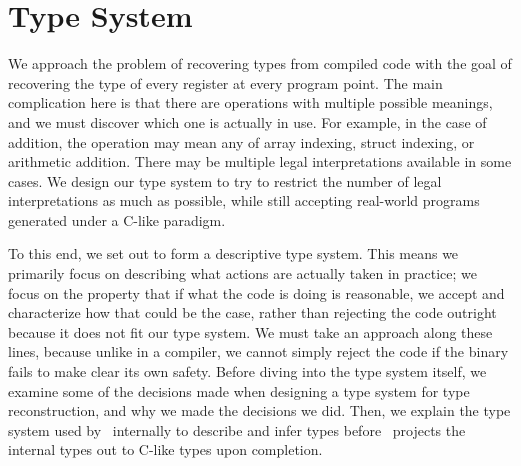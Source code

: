 \section{Type System}
\label{sec:typesys}
We approach the problem of recovering types from compiled code with the goal of recovering the type of every register at every program point. The main complication here is that there are operations with multiple possible meanings, and we must discover which one is actually in use. For example, in the case of addition, the operation may mean any of array indexing, struct indexing, or arithmetic addition.
There may be multiple legal interpretations available in some cases.
We design our type system to try to restrict the number of legal interpretations as much as possible, while still accepting real-world programs generated under a C-like paradigm.

To this end, we set out to form a descriptive type system. This means we primarily focus on describing what actions are actually taken in practice; we focus on the property that if what the code is doing is reasonable, we accept and characterize how that could be the case, rather than rejecting the code outright because it does not fit our type system.
We must take an approach along these lines, because unlike in a compiler, we cannot simply reject the code if the binary fails to make clear its own safety. Before diving into the type system itself, we examine some of the decisions made when designing a type system for type reconstruction, and why we made the decisions we did. Then, we explain the type system used by \bitr\ internally to describe and infer types before \bitr\ projects the internal types out to C-like types upon completion.

